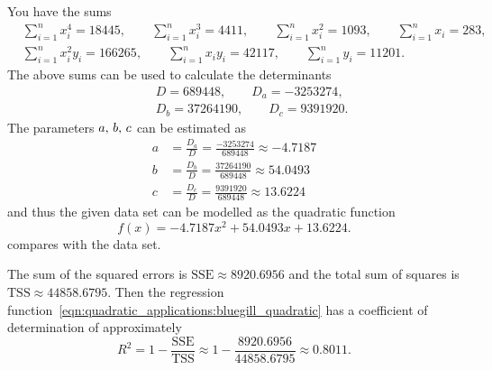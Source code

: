 \documentclass[a4paper,oneside,12pt]{article}
\begin{document}
\begin{problem}
{\begin{solution}
You have the sums
\begin{align*}
&\sum_{i=1}^n x_i^4
=
18445,
\qquad
\sum_{i=1}^n x_i^3
=
4411,
\qquad
\sum_{i=1}^n x_i^2
=
1093,
\qquad
\sum_{i=1}^n x_i
=
283, \\[4pt]
&\sum_{i=1}^n x_i^2 y_i
=
166265,
\qquad
\sum_{i=1}^n x_i y_i
=
42117,
\qquad
\sum_{i=1}^n y_i
=
11201.
\end{align*}
The above sums can be used to calculate the determinants
\begin{align*}
&D
=
689448,
\qquad
D_a
=
-3253274, \\[4pt]
\qquad
&D_b
=
37264190,
\qquad
D_c
=
9391920.
\end{align*}
The parameters ${a},\, {b},\, {c}$ can be estimated as
\begin{align*}
a
&=
\frac{D_a}{D}
=
\frac{-3253274}{689448}
\approx
-4.7187 \\[4pt]
b
&=
\frac{D_b}{D}
=
\frac{37264190}{689448}
\approx
54.0493 \\[4pt]
c
&=
\frac{D_c}{D}
=
\frac{9391920}{689448}
\approx
13.6224
\end{align*}
and thus the given data set can be modelled as the quadratic function
\begin{equation}
\label{eqn:quadratic_applications:bluegill_quadratic}
f(x)
=
-4.7187x^2 + 54.0493x + 13.6224.
\end{equation}
 compares
 with the data
set.

The sum of the squared errors is $\text{SSE} \approx 8920.6956$ and
the total sum of squares is $\text{TSS} \approx 44858.6795$.  Then the
regression
function~\eqref{eqn:quadratic_applications:bluegill_quadratic} has a
coefficient of determination of approximately
\[
R^2
=
1
-
\frac{\text{SSE}}{\text{TSS}}
\approx
1
-
\frac{8920.6956}{44858.6795}
\approx
0.8011.
\]


\end{solution}}
\end{problem}
\end{document}
